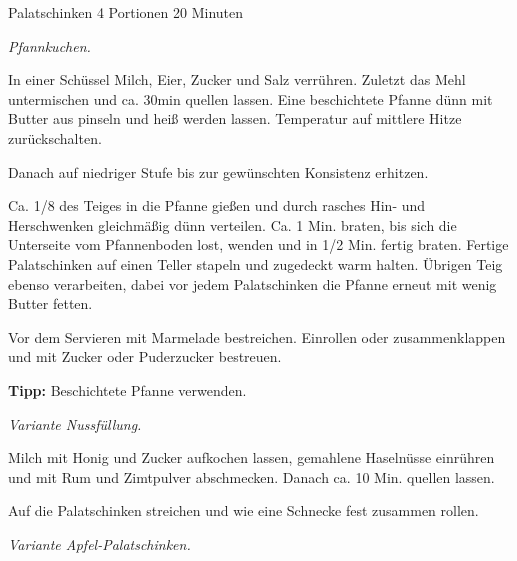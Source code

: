 \begin{recipe}{Palatschinken} {4 Portionen} {20 Minuten}

  \freeform
  \textit{Pfannkuchen.}
  

  In einer Schüssel Milch, Eier, Zucker und Salz verrühren.
  Zuletzt das Mehl untermischen und ca. 30min quellen lassen.
  Eine beschichtete Pfanne dünn mit Butter aus pinseln und heiß werden lassen.
  Temperatur auf mittlere Hitze zurückschalten.

  \newstep
  Danach auf niedriger Stufe bis zur gewünschten Konsistenz erhitzen.

  \newstep
  Ca. 1/8 des Teiges in die Pfanne gießen und durch rasches Hin- und Herschwenken gleichmäßig dünn verteilen.
  Ca. 1 Min. braten, bis sich die Unterseite vom Pfannenboden lost, wenden und in 1/2 Min. fertig braten.
  Fertige Palatschinken auf einen Teller stapeln und zugedeckt warm halten.
  Übrigen Teig ebenso verarbeiten, dabei vor jedem Palatschinken die Pfanne erneut mit wenig Butter fetten.

  \newstep
  Vor dem Servieren mit Marmelade bestreichen.
  Einrollen oder zusammenklappen und mit Zucker oder Puderzucker bestreuen.
  
  \freeform
  \hrulefill

  \freeform
  \textbf{Tipp:}
  Beschichtete Pfanne verwenden.
  \newpage

  \freeform
  \textit{Variante Nussfüllung.}
  

  Milch mit Honig und Zucker aufkochen lassen, gemahlene Haselnüsse einrühren und mit Rum und Zimtpulver abschmecken.
  Danach ca. 10 Min. quellen lassen.

  \newstep
  Auf die Palatschinken streichen und wie eine Schnecke fest zusammen rollen.

  \freeform
  \hrulefill

  \freeform
  \textit{Variante Apfel-Palatschinken.}
  


\end{recipe}

